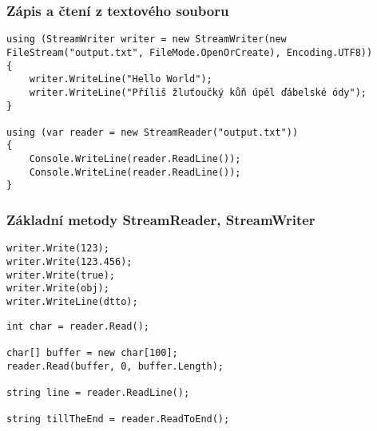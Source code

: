 \begin{frame}[fragile]
\frametitle{Zápis a čtení z textového souboru}
\begin{yesblock}
\begin{lstlisting}
using (StreamWriter writer = new StreamWriter(new FileStream("output.txt", FileMode.OpenOrCreate), Encoding.UTF8))
{
    writer.WriteLine("Hello World");
    writer.WriteLine("Příliš žluťoučký kůň úpěl ďábelské ódy");
}

using (var reader = new StreamReader("output.txt"))
{
    Console.WriteLine(reader.ReadLine());
    Console.WriteLine(reader.ReadLine());
}
\end{lstlisting}
\end{yesblock}
\end{frame}


\begin{frame}[fragile]
\frametitle{Základní metody StreamReader, StreamWriter}
\vfill
\begin{yesblock}
\begin{lstlisting}
writer.Write(123);
writer.Write(123.456);
writer.Write(true);
writer.Write(obj);
writer.WriteLine(dtto);
\end{lstlisting}
\end{yesblock}
\vfill
\begin{yesblock}
\begin{lstlisting}
int char = reader.Read();

char[] buffer = new char[100];
reader.Read(buffer, 0, buffer.Length);

string line = reader.ReadLine();

string tillTheEnd = reader.ReadToEnd();
\end{lstlisting}
\end{yesblock}
\vfill
\end{frame}






